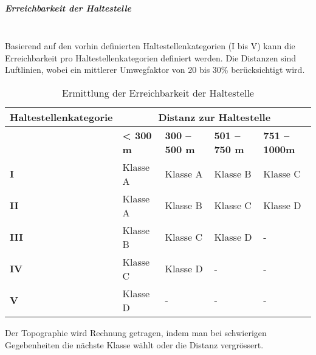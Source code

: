 \subparagraph{Erreichbarkeit der Haltestelle}~\\
\label{Definition ÖV-Güteklassen:Erreichbarkeit der Haltestelle}
Basierend auf den vorhin definierten Haltestellenkategorien (I bis V) kann die Erreichbarkeit pro Haltestellenkategorien definiert werden.
Die Distanzen sind Luftlinien, wobei ein mittlerer Umwegfaktor von 20 bis 30\% berücksichtigt wird.

\begin{table}[ht]
    \begin{tabular}[c]{l p{2.5cm} p{2.5cm} p{2.5cm} p{2.5cm}}
        \toprule
        \textbf{Haltestellenkategorie}
                                & \multicolumn{4}{c}{\textbf{Distanz zur Haltestelle}}\\
        \midrule
        \textbf{}
                                & \textbf{< 300 m}
                                & \textbf{300 -- 500 m}
                                & \textbf{501 -- 750 m}
                                & \textbf{751 -- 1000m}\\
        \textbf{I}
                                & Klasse A
                                & Klasse A
                                & Klasse B
                                & Klasse C\\
        \textbf{II}
                                & Klasse A
                                & Klasse B
                                & Klasse C
                                & Klasse D\\
        \textbf{III}
                                & Klasse B
                                & Klasse C
                                & Klasse D
                                & -\\
        \textbf{IV}
                                & Klasse C
                                & Klasse D
                                & -
                                & -\\
        \textbf{V}
                                & Klasse D
                                & -
                                & -
                                & -\\
        \bottomrule
    \end{tabular}
    \caption{Ermittlung der Erreichbarkeit der Haltestelle}
    \label{table:Ermittlung Erreichbarkeit der Haltestelle}
\end{table}

Der Topographie wird Rechnung getragen, indem man bei schwierigen Gegebenheiten die nächste Klasse wählt oder die Distanz vergrössert.


